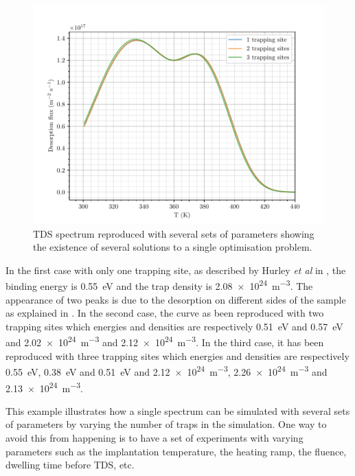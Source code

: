\begin{figure}[h!]
    \centering
    \includegraphics[width=0.9\linewidth]{Figures/Chapter3/Parametric_optimisation/hurley_comparison.pdf}
    \caption{TDS spectrum reproduced with several sets of parameters showing the existence of several solutions to a single optimisation problem.}
    \label{fig:hurley_comparison}
\end{figure}

In the first case with only one trapping site, as described by Hurley \textit{et al} in , the binding energy is \SI{0.55}{eV} and the trap density is \SI{2.08e24}{m^{-3}}.
The appearance of two peaks is due to the desorption on different sides of the sample as explained in \cite{hurley_numerical_2015}.
In the second case, the curve as been reproduced with two trapping sites which energies and densities are respectively \SI{0.51}{eV} and \SI{0.57}{eV} and \SI{2.02e24}{m^{-3}} and \SI{2.12e24}{m^{-3}}.
In the third case, it has been reproduced with three trapping sites which energies and densities are respectively \SI{0.55}{eV}, \SI{0.38}{eV} and \SI{0.51}{eV} and \SI{2.12e24}{m^{-3}}, \SI{2.26e24}{m^{-3}} and \SI{2.13e24}{m^{-3}}.

This example illustrates how a single spectrum can be simulated with several sets of parameters by varying the number of traps in the simulation.
One way to avoid this from happening is to have a set of experiments with varying parameters such as the implantation temperature, the heating ramp, the fluence, dwelling time before TDS, etc.
